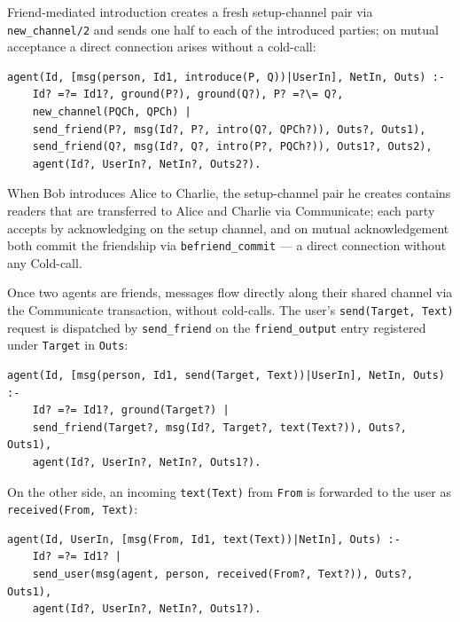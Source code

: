 Friend-mediated introduction creates a fresh setup-channel pair via \verb|new_channel/2| and sends one half to each of the introduced parties; on mutual acceptance a direct connection arises without a cold-call:
\begin{verbatim}
agent(Id, [msg(person, Id1, introduce(P, Q))|UserIn], NetIn, Outs) :-
    Id? =?= Id1?, ground(P?), ground(Q?), P? =?\= Q?,
    new_channel(PQCh, QPCh) |
    send_friend(P?, msg(Id?, P?, intro(Q?, QPCh?)), Outs?, Outs1),
    send_friend(Q?, msg(Id?, Q?, intro(P?, PQCh?)), Outs1?, Outs2),
    agent(Id?, UserIn?, NetIn?, Outs2?).
\end{verbatim}
When Bob introduces Alice to Charlie, the setup-channel pair he creates contains readers that are transferred to Alice and Charlie via Communicate; each party accepts by acknowledging on the setup channel, and on mutual acknowledgement both commit the friendship via \verb|befriend_commit| --- a direct connection without any Cold-call.

Once two agents are friends, messages flow directly along their shared channel via the Communicate transaction, without cold-calls.  The user's \verb|send(Target, Text)| request is dispatched by \verb|send_friend| on the \verb|friend_output| entry registered under \verb|Target| in \verb|Outs|:
\begin{verbatim}
agent(Id, [msg(person, Id1, send(Target, Text))|UserIn], NetIn, Outs) :-
    Id? =?= Id1?, ground(Target?) |
    send_friend(Target?, msg(Id?, Target?, text(Text?)), Outs?, Outs1),
    agent(Id?, UserIn?, NetIn?, Outs1?).
\end{verbatim}
On the other side, an incoming \verb|text(Text)| from \verb|From| is forwarded to the user as \verb|received(From, Text)|:
\begin{verbatim}
agent(Id, UserIn, [msg(From, Id1, text(Text))|NetIn], Outs) :-
    Id? =?= Id1? |
    send_user(msg(agent, person, received(From?, Text?)), Outs?, Outs1),
    agent(Id?, UserIn?, NetIn?, Outs1?).
\end{verbatim}

